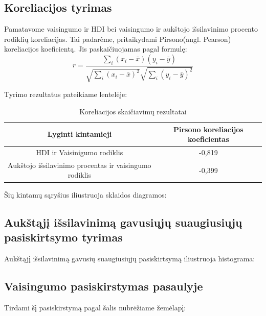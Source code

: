 \subsection{Koreliacijos tyrimas}
Pamatavome vaisingumo ir HDI bei vaisingumo ir aukštojo išsilavinimo procento rodiklių koreliacijas. Tai padarėme, pritaikydami Pirsono(angl. Pearson) koreliacijos koeficientą. Jis paskaičiuojamas pagal formulę: 
\begin{equation}
r = \frac{\sum\limits_i (x_i - \bar{x})(y_i - \bar{y})}{\sqrt{\sum\limits_i(x_i - \bar{x})^2}\sqrt{\sum\limits_i(y_i - \bar{y})^2}}
\end{equation}

Tyrimo rezultatus pateikiame lentelėje:
\begin{table}[H]
\begin{center}
    \begin{tabular}{|c|c|}
        \hline
        \textbf{Lyginti kintamieji} & \textbf{Pirsono koreliacijos koeficientas} \\\hline
        HDI ir Vaisinigumo rodiklis & -0,819 \\\hline
        Aukštojo išsilavinimo procentas ir vaisingumo rodiklis & -0,399 \\\hline
    \end{tabular}
    \caption{Koreliacijos skaičiavimų rezultatai}
\end{center}
\end{table}

Šių kintamų sąryšius iliustruoja sklaidos diagramos:
\begin{multicols}{2}
\end{multicols}

\pagebreak

\subsection{Aukštąjį išsilavinimą gavusiųjų suaugiusiųjų pasiskirtsymo tyrimas} 

Aukštąjį išsilavinimą gavusių suaugiusiųjų pasiskirtsymą iliustruoja histograma:

\subsection{Vaisingumo pasiskirstymas pasaulyje}
Tirdami šį pasiskirstymą pagal šalis nubrėžiame žemėlapį:

